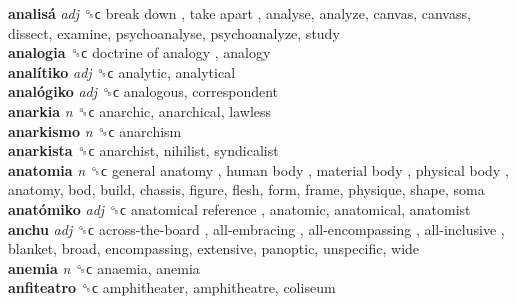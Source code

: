 \textbf{analisá} \emph{adj}  ␝ϲ   break down ,  take apart , analyse, analyze, canvas, canvass, dissect, examine, psychoanalyse, psychoanalyze, study  \\
\textbf{analogia} ␝ϲ   doctrine of analogy , analogy  \\
\textbf{analítiko} \emph{adj}  ␝ϲ  analytic, analytical  \\
\textbf{analógiko} \emph{adj}  ␝ϲ  analogous, correspondent  \\
\textbf{anarkia} \emph{n}  ␝ϲ  anarchic, anarchical, lawless  \\
\textbf{anarkismo} \emph{n}  ␝ϲ  anarchism  \\
\textbf{anarkista} ␝ϲ  anarchist, nihilist, syndicalist  \\
\textbf{anatomia} \emph{n}  ␝ϲ   general anatomy ,  human body ,  material body ,  physical body , anatomy, bod, build, chassis, figure, flesh, form, frame, physique, shape, soma  \\
\textbf{anatómiko} \emph{adj}  ␝ϲ   anatomical reference , anatomic, anatomical, anatomist  \\
\textbf{anchu} \emph{adj}  ␝ϲ   across-the-board ,  all-embracing ,  all-encompassing ,  all-inclusive , blanket, broad, encompassing, extensive, panoptic, unspecific, wide  \\
\textbf{anemia} \emph{n}  ␝ϲ  anaemia, anemia  \\
\textbf{anfiteatro} ␝ϲ  amphitheater, amphitheatre, coliseum  \\
